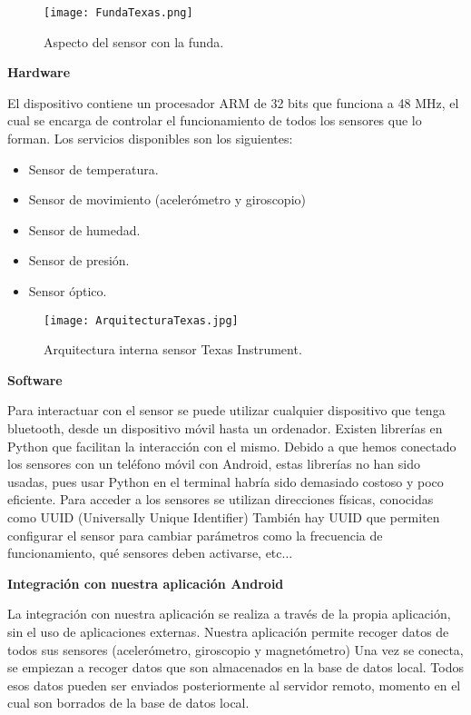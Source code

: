 \documentclass[11pt,spanish]{article}
\begin{document}
\begin{figure}[h!]
  \centering
  \texttt{[image: FundaTexas.png]}
  \caption{Aspecto del sensor con la funda.}
\end{figure}
\newpage

{\bf Hardware}
\newline

El dispositivo contiene un procesador ARM de 32 bits que funciona a 48 MHz, el cual se encarga de controlar el funcionamiento de todos los sensores que lo forman. Los servicios disponibles son los siguientes:

\begin{itemize}
  \item Sensor de temperatura.
  \item Sensor de movimiento (acelerómetro y giroscopio)
  \item Sensor de humedad.
  \item Sensor de presión.
  \item Sensor óptico.
\end{itemize}

\begin{figure}[h!]
  \centering
  \texttt{[image: ArquitecturaTexas.jpg]}
  \caption{Arquitectura interna sensor Texas Instrument.}
\end{figure}
\newpage

{\bf Software}
\newline

Para interactuar con el sensor se puede utilizar cualquier dispositivo que tenga bluetooth, desde un dispositivo móvil hasta un ordenador. Existen librerías en Python que facilitan la interacción con el mismo. Debido a que hemos conectado los sensores con un teléfono móvil con Android, estas librerías no han sido usadas, pues usar Python en el terminal habría sido demasiado costoso y poco eficiente. Para acceder a los sensores se utilizan direcciones físicas, conocidas como UUID (Universally Unique Identifier) También hay UUID que permiten configurar el sensor para cambiar parámetros como la frecuencia de funcionamiento, qué sensores deben activarse, etc...
\newline

{\bf Integración con nuestra aplicación Android}
\newline

La integración con nuestra aplicación se realiza a través de la propia aplicación, sin el uso de aplicaciones externas. Nuestra aplicación permite recoger datos de todos sus sensores (acelerómetro, giroscopio y magnetómetro) Una vez se conecta, se empiezan a recoger datos que son almacenados en la base de datos local. Todos esos datos pueden ser enviados posteriormente al servidor remoto, momento en el cual son borrados de la base de datos local.
\end{document}
